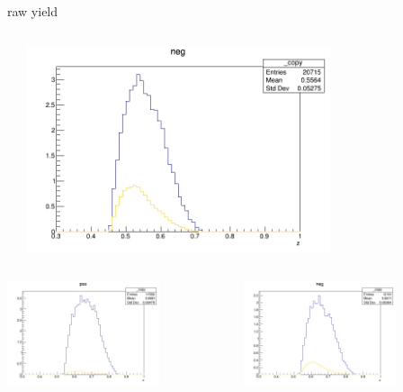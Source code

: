 \begin{frame}{raw yield}
\begin{columns}
\begin{column}[T]{0.25\textwidth}
\end{column}
\begin{column}[T]{0.25\textwidth}
\includegraphics[width = 0.7\textwidth]{results/yield/statistics/yield_x_Q2_z_0.60_5.500_0.55_neg.png}
\end{column}
\end{columns}
\begin{columns}
\begin{column}[T]{0.25\textwidth}
\includegraphics[width = 0.7\textwidth]{results/yield/statistics/yield_x_Q2_z_0.60_5.500_0.65_pos.png}
\end{column}
\begin{column}[T]{0.25\textwidth}
\includegraphics[width = 0.7\textwidth]{results/yield/statistics/yield_x_Q2_z_0.60_5.500_0.65_neg.png}

\end{column}
\end{columns}
\end{frame}
